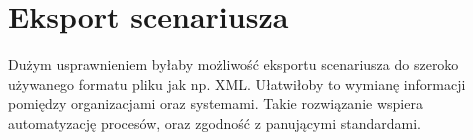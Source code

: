 \section{Eksport scenariusza}

Dużym usprawnieniem byłaby możliwość eksportu scenariusza do szeroko używanego formatu pliku jak np. XML.
Ułatwiłoby to wymianę informacji pomiędzy organizacjami oraz systemami. Takie rozwiązanie wspiera automatyzację procesów,
oraz zgodność z panującymi standardami.
